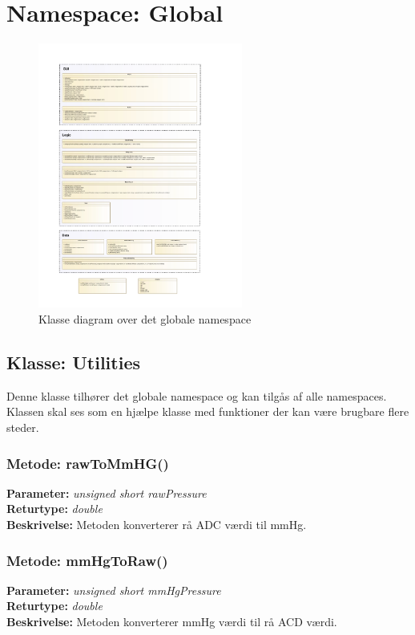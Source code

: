 \section{Namespace: Global}

\begin{figure}[H]
	\centering
	\includegraphics[width=0.6\textwidth]{Implementeringsdokument/klassediagram_extra-crop.pdf}
	\caption{Klasse diagram over det globale namespace}\label{fig:classDiagramextra}
\end{figure}

\subsection{Klasse: Utilities}
Denne klasse tilhører det globale namespace og kan tilgås af alle namespaces. Klassen skal ses som en hjælpe klasse med funktioner der kan være brugbare flere steder.

\subsubsection{Metode: rawToMmHG()}
\textbf{Parameter: } \textit{unsigned short rawPressure}
\\ \textbf{Returtype: } \textit{double}
\\ \textbf{Beskrivelse: } Metoden konverterer rå ADC værdi til mmHg.

\subsubsection{Metode: mmHgToRaw()}
\textbf{Parameter: } \textit{unsigned short mmHgPressure}
\\ \textbf{Returtype: } \textit{double}
\\ \textbf{Beskrivelse: } Metoden konverterer mmHg værdi til rå ACD værdi.


